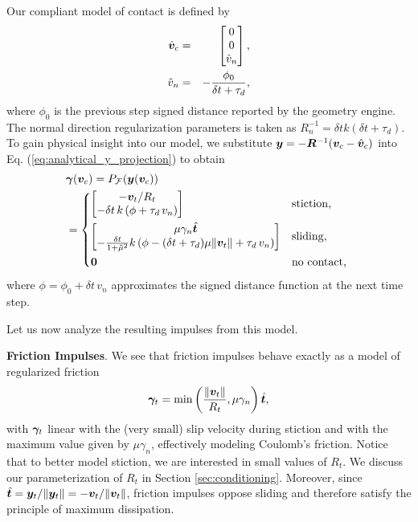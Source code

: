 Our compliant model of contact is defined by
\begin{eqnarray*}
	\hat{{\bm{v}}}_c &=&
	\begin{bmatrix}
		0\\
		0\\
		\hat{v}_n \end{bmatrix}\nonumber,\\
	\hat{v}_n &=& -\frac{\phi_0}{\delta t+\tau_d},
\end{eqnarray*}
where $\phi_0$ is the previous step signed distance reported by the geometry engine. The normal direction
regularization parameters is taken as $R_n^{-1} = \delta t k(\delta t+\tau_d)$.
To gain physical insight into our model, we substitute
${\bm{y}}=-{\bm{R}}^{-1}({\bm{v}}_c - \hat{{\bm{v}}}_c)$ into Eq.
(\ref{eq:analytical_y_projection}) to obtain 
\begin{align*}
	&{\bm\gamma}({\bm{v}}_c) = P_\mathcal{F}({\bm{y}}({\bm{v}}_c))\\
&=\begin{dcases}
	\begin{bmatrix}
		-{\bm{v}}_t/R_t\\
		-\delta t\,k\,(\phi + \tau_d\,v_n)
	\end{bmatrix}
	& \text{stiction, } \\
	\begin{bmatrix}
		\mu\gamma_n\hat{{\bm{t}}}\\
		-\frac{\delta t}{1+\tilde\mu^2}k\left(\phi-(\delta
		t+\tau_d)\mu\Vert{\bm{v}}_t\Vert + \tau_d\,v_n \right)
	\end{bmatrix}
	& \text{sliding, }\\
    {\bm{0}} & \text{no contact, } \end{dcases}\nonumber	
\end{align*}
where $\phi= \phi_0 + \delta t\,v_n$ approximates the signed distance function
at the next time step.

Let us now analyze the resulting impulses from this
model.

\textbf{Friction Impulses}. We see that friction impulses behave exactly as a model
of regularized friction
\begin{equation}
	\bgamma_t = \min\left(\frac{\Vert\vf{v}_t\Vert}{R_t}, \mu\gamma_n\right)\hat{\vf{t}},
	\label{eq:regularized_friction}
\end{equation}
with ${\bm\gamma}_t$ linear with the (very small) slip velocity during stiction and
with the maximum value given by $\mu\gamma_n$, effectively modeling Coulomb's
friction. Notice that to better model stiction, we are interested in small
values of $R_t$. We discuss our parameterization of $R_t$ in Section
\ref{sec:conditioning}. Moreover, since $\hat{{\bm{t}}} =
{\bm{y}}_t/\Vert{\bm{y}}_t\Vert = -{\bm{v}}_t/\Vert{\bm{v}}_t\Vert$, friction impulses
oppose sliding and therefore satisfy the principle of maximum dissipation.


